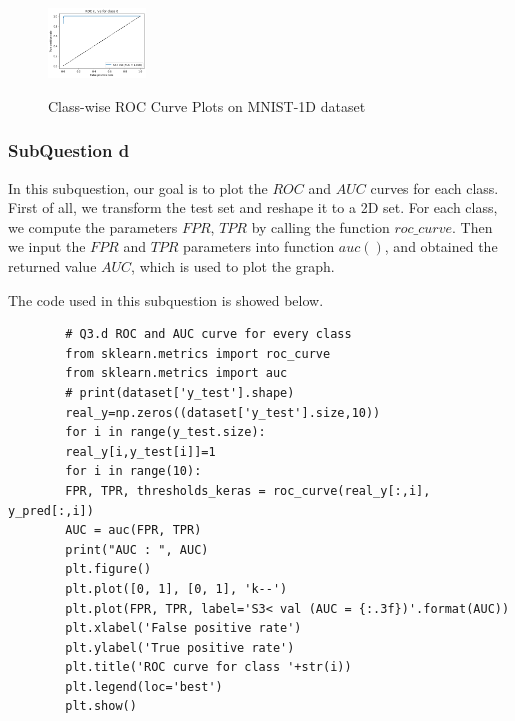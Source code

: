\documentclass[conference]{IEEEtran}
\begin{document}
\begin{figure}[t]
{			\includegraphics[width=0.23\textwidth]{ROC6.png}}
		
		\caption{Class-wise ROC Curve Plots on MNIST-1D dataset}
		\label{Fig.ba}
	\end{figure}
	\subsubsection{SubQuestion d}
	In this subquestion, our goal is to plot the $ROC$ and $AUC$ curves for each class. First of all, we transform the test set and reshape it to a 2D set. For each class, we compute the parameters $FPR$, $TPR$ by calling the function $roc\_curve$. Then we input the $FPR$ and $TPR$ parameters into function $auc()$, and obtained the returned value $AUC$, which is used to plot the graph.\par
	The code used in this subquestion is showed below.
	\begin{lstlisting}
		# Q3.d ROC and AUC curve for every class
		from sklearn.metrics import roc_curve
		from sklearn.metrics import auc
		# print(dataset['y_test'].shape)
		real_y=np.zeros((dataset['y_test'].size,10))
		for i in range(y_test.size):
		real_y[i,y_test[i]]=1
		for i in range(10):
		FPR, TPR, thresholds_keras = roc_curve(real_y[:,i], y_pred[:,i])   
		AUC = auc(FPR, TPR)
		print("AUC : ", AUC)
		plt.figure()
		plt.plot([0, 1], [0, 1], 'k--')
		plt.plot(FPR, TPR, label='S3< val (AUC = {:.3f})'.format(AUC))
		plt.xlabel('False positive rate')
		plt.ylabel('True positive rate')
		plt.title('ROC curve for class '+str(i))
		plt.legend(loc='best')
		plt.show()   
	\end{lstlisting}
	
\end{document}
